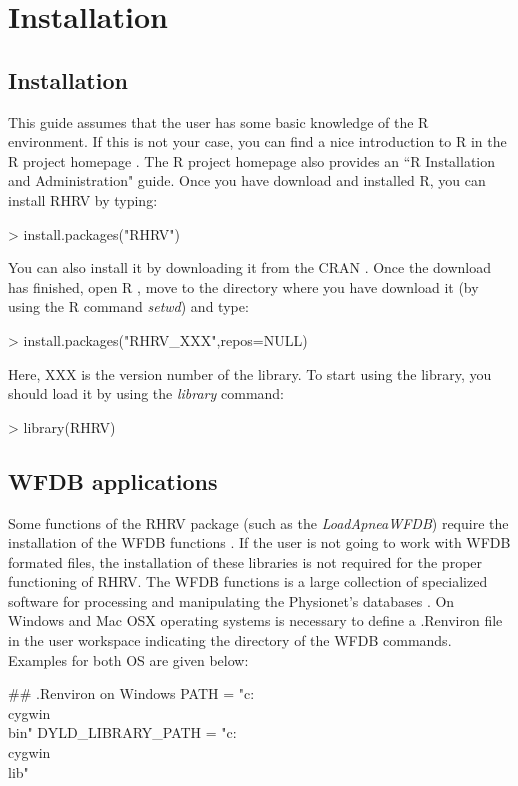 
\chapter{Installation\label{ch:installation}}
\section{Installation} This guide assumes that the user has some basic knowledge of the R environment. If this is not your case, you can find a nice introduction to R in the R project homepage \cite{Rproject}. The R project homepage also provides an ``R Installation and Administration" guide. Once you have download and installed R, you can install RHRV by typing:
\begin{Schunk}
\begin{Sinput}
> install.packages("RHRV")
\end{Sinput}
\end{Schunk}
You can also install it by downloading it from the CRAN \cite{cran}. Once the download has finished, open R , move to the directory where you have download it (by using the R command \textit{setwd}) and type:

\begin{Schunk}
\begin{Sinput}
> install.packages("RHRV_XXX",repos=NULL)
\end{Sinput}
\end{Schunk}
Here, XXX is the version number of the library. To start using the library, you should load it by using the \textit{library} command:
\begin{Schunk}
\begin{Sinput}
> library(RHRV)
\end{Sinput}
\end{Schunk}

\section{WFDB applications} Some functions of the RHRV package (such as the \textit{LoadApneaWFDB}) require the installation of the WFDB functions \cite{moody2003wfdb}. If the user is not going to work with WFDB formated files, the installation of these libraries is not required for the proper functioning of RHRV. The WFDB functions is a large collection of specialized software for processing and manipulating the Physionet's databases \cite{physioNet}. On Windows and Mac OSX operating systems is necessary to define
a .Renviron file in the user workspace indicating the directory
of the WFDB commands. Examples for both OS are given below: 
\begin{Schunk}
\begin{Sinput}
## .Renviron on Windows
PATH = "c:\\cygwin\\bin"
DYLD_LIBRARY_PATH = "c:\\cygwin\\lib"
\end{Sinput}
\end{Schunk}

